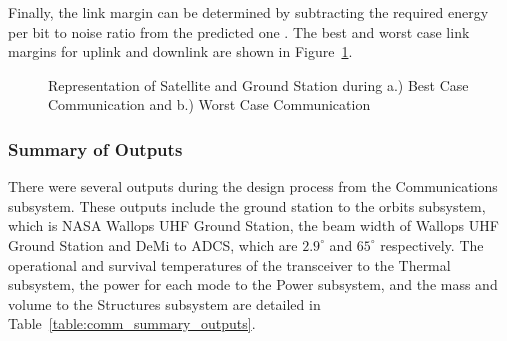 \documentclass[12pt]{article}
\begin{document}
Finally, the link margin can be determined by subtracting the required energy per bit to noise ratio from the predicted one \cite[p.~478]{SMAD}. The best and worst case link margins for uplink and downlink are shown in Figure~\ref{fig:comm_cases}.


\begin{figure}
\hfill
{}
\hfill
{}
\hfill
\caption{Representation of Satellite and Ground Station during a.) Best Case Communication and b.) Worst Case Communication}
\label{fig:comm_cases}
\end{figure}
		
\subsubsection{Summary of Outputs}

There were several outputs during the design process from the Communications subsystem. These outputs include the ground station to the orbits subsystem, which is NASA Wallops UHF Ground Station, the beam width of Wallops UHF Ground Station and DeMi to ADCS, which are $2.9^\circ$ and $65^\circ$ respectively. The operational and survival temperatures of the transceiver to the Thermal subsystem, the power for each mode to the Power subsystem, and the mass and volume to the Structures subsystem are detailed in Table~\ref{table:comm_summary_outputs}.
	
\end{document}
